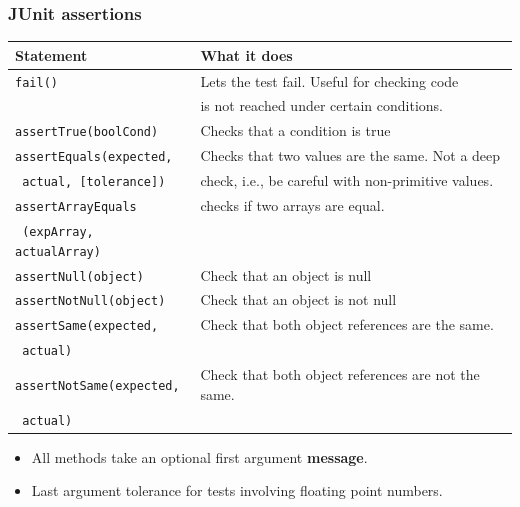 \documentclass{beamer}
\begin{document}
\begin{frame}[fragile]
\frametitle{JUnit assertions}
\label{sec-24}

\footnotesize

\begin{center}
\begin{tabular}{p{}p{}}
 Statement            &  What it does               \\\hline
\small\verb|fail() |
   &  Lets the test fail.  Useful for checking code\\
& is not reached under certain conditions.            \\
\small\verb|assertTrue(boolCond) |
   &  Checks that a condition is true                                                                 \\
\small\verb|assertEquals(expected,| &  Checks that two values are the same. Not a deep\\
\small\verb| actual, [tolerance]) | &   check, i.e., be careful with non-primitive values.  \\

\small\verb|assertArrayEquals| &  checks if two arrays are equal.\\
\small\verb| (expArray, actualArray)| & \\

\small\verb|assertNull(object)|
     &  Check that an object is null                                                                    \\
\small\verb|assertNotNull(object) |
   &  Check that an object is not null                                                                \\
\small\verb|assertSame(expected,|                 &  Check that both object references are the same.                                                 \\
\small\verb| actual)|             &\\
\small\verb|assertNotSame(expected,|              &  Check that both object references are not the same.                                             \\
\small\verb| actual)| &
\end{tabular}
\end{center}
\begin{itemize}

\item All methods take an optional first argument \textbf{message}.

\item Last argument tolerance for tests involving floating point numbers.
\end{itemize} %
\end{frame}
\end{document}
